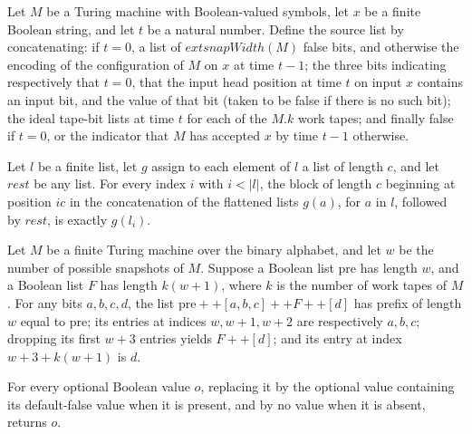 \begin{definition}
\label{Complexity.idealSources}
\leanok
{}
Let $M$ be a Turing machine with Boolean-valued symbols, let $x$ be a finite Boolean
string, and let $t$ be a natural number. Define the source list by concatenating: if
$t=0$, a list of $	ext{snapWidth}(M)$ false bits, and otherwise the encoding of the
configuration of $M$ on $x$ at time $t-1$; the three bits indicating respectively that
$t=0$, that the input head position at time $t$ on input $x$ contains an input bit, and
the value of that bit (taken to be false if there is no such bit); the ideal tape-bit
lists at time $t$ for each of the $M.k$ work tapes; and finally false if $t=0$, or the
indicator that $M$ has accepted $x$ by time $t-1$ otherwise.
\end{definition}

\begin{theorem}
\label{Complexity.CfgTableau.take_drop_flatMap_append}
\leanok
{}
Let $l$ be a finite list, let $g$ assign to each element of $l$ a list of length $c$,
and let $rest$ be any list. For every index $i$ with $i<|l|$, the block of length $c$
beginning at position $ic$ in the concatenation of the flattened lists $g(a)$, for $a$
in $l$, followed by $rest$, is exactly $g(l_i)$.
\end{theorem}

\begin{theorem}
\label{Complexity.decode_layout}
\leanok
{}
Let $M$ be a finite Turing machine over the binary alphabet, and let $w$ be the number
of possible snapshots of $M$. Suppose a Boolean list $\mathrm{pre}$ has length $w$, and
a Boolean list $F$ has length $k(w+1)$, where $k$ is the number of work tapes of $M$.
For any bits $a,b,c,d$, the list $\mathrm{pre} ++ [a,b,c] ++ F ++ [d]$ has prefix of
length $w$ equal to $\mathrm{pre}$; its entries at indices $w,w+1,w+2$ are respectively
$a,b,c$; dropping its first $w+3$ entries yields $F ++ [d]$; and its entry at index
$w+3+k(w+1)$ is $d$.
\end{theorem}

\begin{theorem}
\label{Complexity.option_isSome_getD}
\leanok
{}
For every optional Boolean value $o$, replacing it by the optional value containing its
default-false value when it is present, and by no value when it is absent, returns $o$.
\end{theorem}

